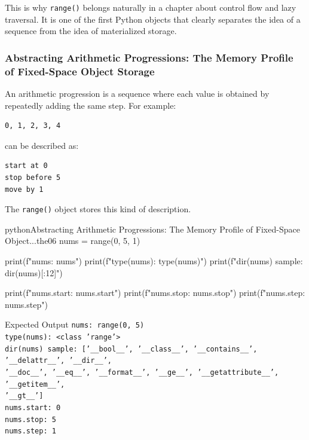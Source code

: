 \documentclass[a4paper,twoside]{report}
\begin{document}
This is why \texttt{range()} belongs naturally in a chapter about control flow and lazy traversal. It is one of the first Python objects that clearly separates the idea of a sequence from the idea of materialized storage.

\subsubsection{Abstracting Arithmetic Progressions: The Memory Profile of Fixed-Space Object Storage}

An arithmetic progression is a sequence where each value is obtained by repeatedly adding the same step. For example:

\begin{verbatim}
0, 1, 2, 3, 4
\end{verbatim}

can be described as:

\begin{verbatim}
start at 0
stop before 5
move by 1
\end{verbatim}

The \texttt{range()} object stores this kind of description.

\begin{codebox}[]{python}{Abstracting Arithmetic Progressions: The Memory Profile of Fixed-Space Object...}{the06}
nums = range(0, 5, 1)

print(f"nums: {nums}")
print(f"type(nums): {type(nums)}")
print(f"dir(nums) sample: {dir(nums)[:12]}")

print(f"nums.start: {nums.start}")
print(f"nums.stop: {nums.stop}")
print(f"nums.step: {nums.step}")
\end{codebox}


\begin{iobox}{Expected Output}
\texttt{nums: range(0, 5)} \\
\texttt{type(nums): <class 'range'>} \\
\texttt{dir(nums) sample: ['\_\_bool\_\_', '\_\_class\_\_', '\_\_contains\_\_', '\_\_delattr\_\_', '\_\_dir\_\_',} \\
\texttt{'\_\_doc\_\_', '\_\_eq\_\_', '\_\_format\_\_', '\_\_ge\_\_', '\_\_getattribute\_\_', '\_\_getitem\_\_',} \\
\texttt{'\_\_gt\_\_']} \\
\texttt{nums.start: 0} \\
\texttt{nums.stop: 5} \\
\texttt{nums.step: 1} \\
\end{iobox}
\end{document}
